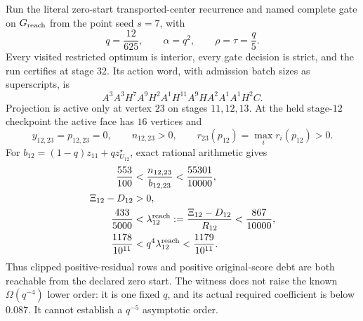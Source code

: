 \begin{proposition}
\label{prop:reachable-positive-residual-projection}
Run the literal zero-start transported-center recurrence and named complete
gate on $G_{\rm reach}$ from the point seed $s=7$, with
\begin{equation*}
 q=\frac{12}{625},\qquad \alpha=q^2,
 \qquad \rho=\tau=\frac q5.
\end{equation*}
Every visited restricted optimum is interior, every gate decision is strict,
and the run certifies at stage $32$.  Its action word, with admission batch
sizes as superscripts, is
\begin{equation}
 A^3A^3H^7A^9H^2A^1H^{11}A^9HA^2A^1A^1H^2C.
 \label{eq:reachable-projection-action-word}
\end{equation}
Projection is active only at vertex $23$ on stages $11,12,13$.  At the held
stage-$12$ checkpoint the active face has $16$ vertices and
\begin{equation}
 y_{12,23}=p_{12,23}=0,\qquad
 n_{12,23}>0,\qquad
 r_{23}(p_{12})=\max_i r_i(p_{12})>0.
 \label{eq:reachable-projection-positive-row}
\end{equation}
For $b_{12}=(1-q)z_{11}+qz_{U_{12}}^\star$, exact rational arithmetic gives
\begin{align}
 \frac{553}{100}
 &<\frac{n_{12,23}}{b_{12,23}}<\frac{55301}{10000},
 \label{eq:reachable-projection-anchor-ratio}\\
 \Xi_{12}-D_{12}&>0,
 \label{eq:reachable-projection-positive-debt}\\
 \frac{433}{5000}
 &<\lambda_{12}^{\rm reach}
 :=\frac{\Xi_{12}-D_{12}}{R_{12}}
 <\frac{867}{10000},
 \label{eq:reachable-projection-required-coefficient}\\
 \frac{1178}{10^{11}}
 &<q^4\lambda_{12}^{\rm reach}<\frac{1179}{10^{11}}.
 \label{eq:reachable-projection-scaled-coefficient}
\end{align}
Thus clipped positive-residual rows and positive original-score debt are both
reachable from the declared zero start.  The witness does not raise the known
$\Omega(q^{-4})$ lower order: it is one fixed $q$, and its actual required
coefficient is below $0.087$.  It cannot establish a $q^{-5}$ asymptotic
order.
\end{proposition}

